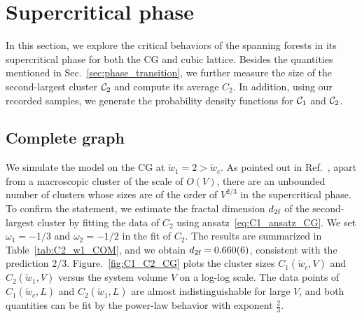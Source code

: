\section{Supercritical phase}
In this section, we explore the critical behaviors of the spanning forests in its supercritical phase for both the CG and cubic lattice.
Besides the quantities mentioned in Sec.~\ref{sec:phase_transition}, we further measure the size of the second-largest cluster ${\mathcal C}_2$ and 
compute its average $C_2$.
In addition, using our recorded samples, we generate the probability density functions for ${\mathcal C}_1$ and ${\mathcal C}_2$.

\subsection{Complete graph}


We simulate the model on the CG at $\tilde{w}_1 = 2 > \tilde{w}_c$. As pointed out in Ref.~, apart from
a macroscopic cluster of the scale of $O(V)$, there are an unbounded number of clusters whose sizes are of the order of $V^{2/3}$ in the
supercritical phase. To confirm the statement, we estimate the fractal dimension ${d_{2\textrm{f}}}$ of the second-largest cluster by fitting the data of $C_2$ using ansatz~\eqref{eq:C1_ansatz_CG}.
We set $\omega_1 = -1/3$ and $\omega_2 = -1/2$ in the fit of $C_2$. The results are summarized in Table~\ref{tab:C2_w1_COM}, and we obtain ${d_{2\textrm{f}}} = 0.660(6)$, 
consistent with the prediction $2/3$. Figure.~\ref{fig:C1_C2_CG} plots the cluster sizes $C_1(\tilde{w}_c, V)$ and $C_2(\tilde{w}_1, V)$ versus the system volume
$V$ on a log-log scale. The data points of $C_1(\tilde{w}_c, L)$ and $C_2(\tilde{w}_1, L)$ are almost indistinguishable for large $V$, and both quantities
can be fit by the power-law behavior with exponent $\frac{2}{3}$.

